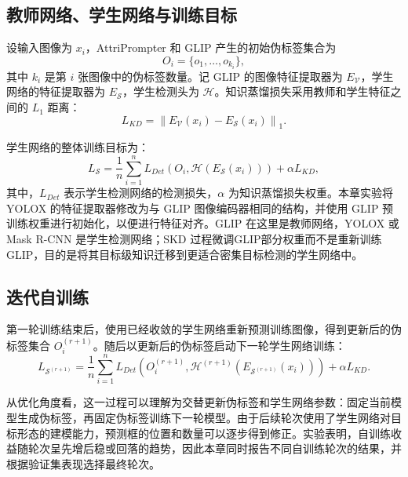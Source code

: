 \subsection{教师网络、学生网络与训练目标}

设输入图像为 $x_i$，AttriPrompter 和 GLIP 产生的初始伪标签集合为
\begin{equation}
O_i=\{o_1,\ldots,o_{k_i}\},
\end{equation}
其中 $k_i$ 是第 $i$ 张图像中的伪标签数量。记 GLIP 的图像特征提取器为 $E_{\mathcal V}$，学生网络的特征提取器为 $E_{\mathcal S}$，学生检测头为 $\mathcal H$。知识蒸馏损失采用教师和学生特征之间的 $L_1$ 距离：
\begin{equation}
\label{eq:attrip_kd}
L_{KD}=\left\|E_{\mathcal V}(x_i)-E_{\mathcal S}(x_i)\right\|_1.
\end{equation}

学生网络的整体训练目标为：
\begin{equation}
\label{eq:attrip_student}
L_{\mathcal S}=\frac{1}{n}\sum_{i=1}^{n}
L_{Det}\left(O_i,\mathcal H(E_{\mathcal S}(x_i))\right)
+\alpha L_{KD},
\end{equation}
其中，$L_{Det}$ 表示学生检测网络的检测损失，$\alpha$ 为知识蒸馏损失权重。本章实验将 YOLOX 的特征提取器修改为与 GLIP 图像编码器相同的结构，并使用 GLIP 预训练权重进行初始化，以便进行特征对齐。GLIP 在这里是教师网络，YOLOX 或 Mask R-CNN 是学生检测网络；SKD 过程微调GLIP部分权重而不是重新训练 GLIP，目的是将其目标级知识迁移到更适合密集目标检测的学生网络中。

\subsection{迭代自训练}

第一轮训练结束后，使用已经收敛的学生网络重新预测训练图像，得到更新后的伪标签集合 $O_i^{(r+1)}$。随后以更新后的伪标签启动下一轮学生网络训练：
\begin{equation}
\label{eq:attrip_iterative}
L_{\mathcal S^{(r+1)}}=\frac{1}{n}\sum_{i=1}^{n}
L_{Det}\left(O_i^{(r+1)},
\mathcal H^{(r+1)}(E_{\mathcal S^{(r+1)}}(x_i))\right)
+\alpha L_{KD}.
\end{equation}

从优化角度看，这一过程可以理解为交替更新伪标签和学生网络参数：固定当前模型生成伪标签，再固定伪标签训练下一轮模型。由于后续轮次使用了学生网络对目标形态的建模能力，预测框的位置和数量可以逐步得到修正。实验表明，自训练收益随轮次呈先增后稳或回落的趋势，因此本章同时报告不同自训练轮次的结果，并根据验证集表现选择最终轮次。

